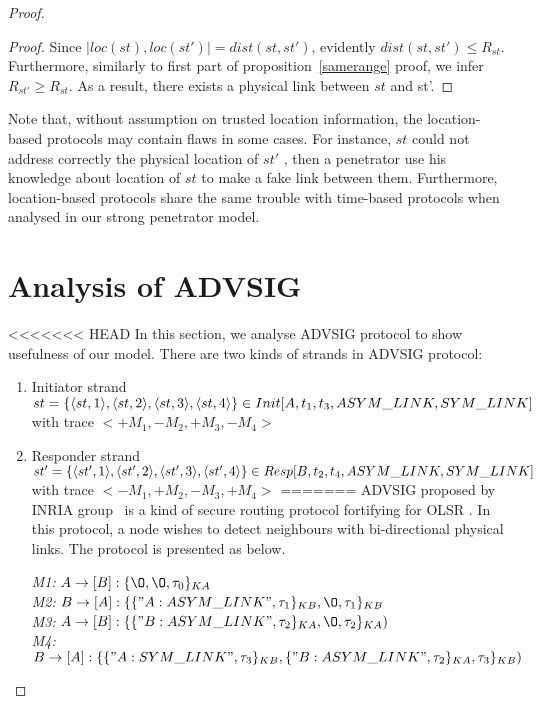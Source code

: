 \begin{flushleft}
\begin{flushleft}
\begin{Definition}
\begin{itemize}
\begin{Definition}
\begin{proof}
\begin{proof}

Since $|loc(st),loc(st')| = dist(st,st')$, evidently $dist(st,st') \le R_{st}$. Furthermore, similarly to first part of proposition~\ref{samerange} proof, we infer $R_{st'} \ge R_{st}$. As a result, there exists a physical link between $st$ and st'. 

\end{proof}

Note that, without assumption on trusted location information, the location-based protocols may contain flaws in some cases. For instance, $st$ could not address correctly the physical location of $st'$ , then a penetrator use his knowledge about location of $st$ to make a fake link between them. Furthermore, location-based protocols share the same trouble with time-based protocols when analysed in our strong penetrator model. 


\section{Analysis of ADVSIG}

<<<<<<< HEAD
In this section, we analyse ADVSIG protocol to show usefulness of our model. There are two kinds of strands in ADVSIG protocol:
\begin{enumerate}
\item Initiator strand $st = \{\langle st, 1 \rangle,\langle st, 2 \rangle,\langle st, 3 \rangle,\langle st, 4 \rangle\} \\ \in Init[A,t_1,t_3,ASYM\_LINK, SYM\_LINK]$ with trace $<+M_1, -M_2 , +M_3,-M_4>$
\item Responder strand $st' = \{\langle st', 1 \rangle,\langle st', 2 \rangle,\langle st', 3 \rangle,\langle st', 4 \rangle\} \\ \in Resp[B,t_2,t_4,ASYM\_LINK, SYM\_LINK]$ with trace $<-M_1, +M_2 , -M_3,+M_4>$
=======
ADVSIG proposed by INRIA group~\cite{Raffo:2004:ASS:1029102.1029106} is a kind of secure routing protocol fortifying for OLSR \cite{Clausen:2003:OLS:RFC3626}. In this protocol, a node wishes to detect neighbours with bi-directional physical links. The protocol is presented as below. 
\begin{flushleft}
 \emph{M1:} $A \to [B]: \{\O, \O, \tau_0\}_{KA}$\\
 \emph{M2:} $B \to [A]: \{\{"A:ASYM\_LINK", \tau_1\}_{KB}, \O,\tau_1\}_{KB}$\\
\emph{M3:} $A \to [B]: \{\{"B:ASYM\_LINK",\tau_2\}_{KA},\O ,\tau_2 \}_{KA})$\\
 \emph{M4:} $B \to [A] : \{\{"A:SYM\_LINK", \tau_3\}_{KB} ,\{"B:ASYM\_LINK",\tau_2\}_{KA} ,\tau_3\}_{KB})$
\end{flushleft}


\end{enumerate}
\end{proof}
\end{Definition}
\end{itemize}
\end{Definition}
\end{flushleft}
\end{flushleft}
